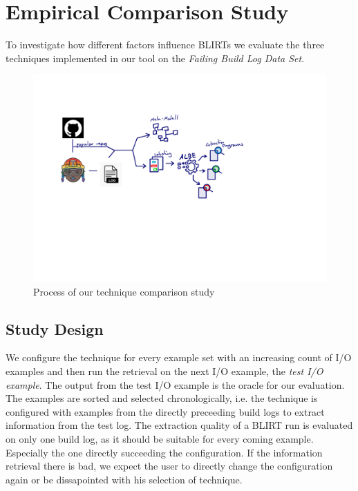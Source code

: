 \documentclass[\myrootdir/main.tex]{subfiles}
\begin{document}
\chapter{Empirical Comparison Study}
\label{sec:study}
To investigate how different factors  influence BLIRTs we evaluate the three techniques implemented in our tool on the \emph{Failing Build Log Data Set}.

\begin{figure}[htbp]
	\centering
	\includegraphics[page=6, width=\textwidth, trim={0.5cm 0.5cm 0.5cm 0.5cm}, clip]{img/flow-of-research.pdf}
	\caption{Process of our technique comparison study}
	\label{fig:study}
\end{figure}

\section{Study Design}
We configure the technique for every example set with an increasing count of I/O examples and then run the retrieval on the next I/O example, the \emph{test I/O example}.
The output from the test I/O example is the oracle for our evaluation.
The examples are sorted and selected chronologically, i.e. the technique is configured with examples from the directly preceeding build logs to extract information from the test log.
The extraction quality of a BLIRT run is evaluated on only one build log, as it should be suitable for every coming example.
Especially the one directly succeeding the configuration.
If the information retrieval there is bad, we expect the user to directly change the configuration again or be dissapointed with his selection of technique.
\end{document}
